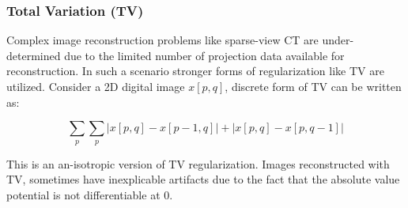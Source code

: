 \subsubsection{Total Variation (TV)}
Complex image reconstruction problems like sparse-view \ac{CT} are under-determined due to the limited number of projection data available for reconstruction. In such a scenario stronger forms of regularization like \ac{TV} are utilized. Consider a 2D digital image $x[p,q]$, discrete form of \ac{TV} can be written as:

\begin{equation}
\sum_{p} \sum_{p}|x[p, q]-x[p-1, q]|+|x[p, q]-x[p, q-1]|
\end{equation}    

This is an an-isotropic version of \ac{TV} regularization. Images reconstructed with \ac{TV}, sometimes have inexplicable artifacts due to the fact that the absolute value potential is not differentiable at $0$. 

